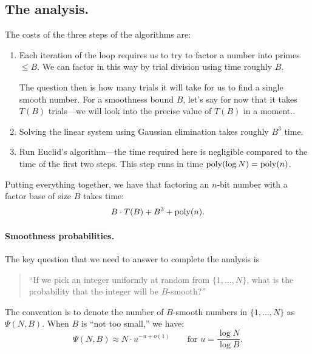 \subsection{The analysis.}

The costs of the three steps of the algorithms are:
\begin{enumerate}
  \item Each iteration of the loop requires us to try to 
        factor a number into primes $\leq B$.
        We can factor in this way by trial division 
        using time roughly $B$.
        
        The question then is how many trials it will
        take for us to find a single smooth number.
        For a smoothness bound $B$, let's say for
        now that it takes $T(B)$ trials---we will look into 
        the precise value of $T(B)$ in a moment..

  \item Solving the linear system using Gaussian elimination 
    takes roughly $B^3$ time.
  \item Run Euclid's algorithm---the time required here is 
        negligible compared to the time of the first two steps.
        This step runs in time $\operatorname{poly}(\log N) = \operatorname{poly}(n)$.
\end{enumerate}

Putting everything together, we have that 
factoring an $n$-bit number with a factor base of
size $B$ takes time: 
\begin{align}
B \cdot T(B) + B^3 + \operatorname{poly}(n). \label{eq:time}
\end{align}


\paragraph{Smoothness probabilities.}
The key question that we need to answer to complete
the analysis is
\begin{quote}
``If we pick an integer uniformly at random from $\{1, \dots, N\}$,
  what is the probability that the integer will be $B$-smooth?''
\end{quote}

The convention is to denote the number of $B$-smooth 
numbers in $\{1, \dots, N\}$ as $\Psi(N,B)$.
When $B$ is ``not too small,'' we have:
\[ \Psi(N, B) \approx N \cdot u^{-u + o(1)}\qquad \text{for } u = \frac{\log N}{\log B}.\]

